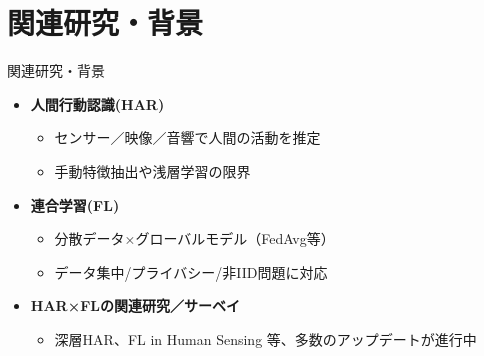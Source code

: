 \documentclass[unicode,12pt,aspectratio=169,dvipdfmx]{beamer}
\begin{document}
\section{関連研究・背景}
\begin{frame}{関連研究・背景}
  \begin{itemize}
    \item \textbf{人間行動認識(HAR)}
    \begin{itemize}
      \item センサー／映像／音響で人間の活動を推定
      \item 手動特徴抽出や浅層学習の限界
    \end{itemize}
    \item \textbf{連合学習(FL)}
    \begin{itemize}
      \item 分散データ×グローバルモデル（FedAvg等）
      \item データ集中/プライバシー/非IID問題に対応
    \end{itemize}
    \item \textbf{HAR×FLの関連研究／サーベイ}
    \begin{itemize}
      \item 深層HAR、FL in Human Sensing 等、多数のアップデートが進行中
    \end{itemize}
  \end{itemize}
\end{frame}
\end{document}
